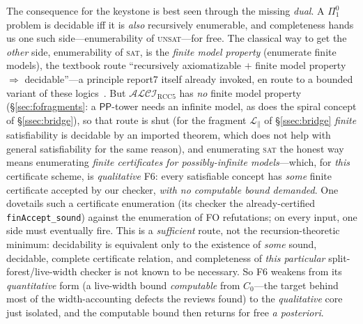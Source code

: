 \documentclass[11pt]{article}
\newcommand{\ALCIRCC}[1]{\mathcal{ALCI}_{\mathrm{RCC#1}}}
\newcommand{\PP}{\mathsf{PP}}
\newcommand{\code}[1]{\texttt{#1}}
\theoremstyle{plain}
\theoremstyle{definition}
\begin{document}
The consequence for the keystone is best seen through the missing
\emph{dual}. A $\Pi^0_1$ problem is decidable iff it is \emph{also}
recursively enumerable, and completeness hands us one such
side---enumerability of \textsc{unsat}---for free. The classical way to get
the \emph{other} side, enumerability of \textsc{sat}, is the \emph{finite
model property} (enumerate finite models), the textbook route ``recursively
axiomatizable $+$ finite model property $\Rightarrow$ decidable''---a
principle report7 itself already invoked, en route to a bounded variant of
these logics~\cite{Wessel2003}. But
$\ALCIRCC{5}$ has \emph{no} finite model property (\S\ref{sec:fofragments}:
a $\PP$-tower needs an infinite model, as does the spiral concept of
\S\ref{ssec:bridge}), so that route is shut (for the fragment
$\mathcal L_{\parallel}$ of \S\ref{ssec:bridge} \emph{finite} satisfiability is
decidable by an imported theorem, which does not help with general
satisfiability for the same reason),
and enumerating \textsc{sat} the honest way means enumerating \emph{finite
certificates for possibly-infinite models}---which, for \emph{this}
certificate scheme, is \emph{qualitative} F6: every satisfiable concept
has \emph{some} finite certificate accepted by our checker, \emph{with no
computable bound demanded}. One dovetails such a certificate enumeration
(its checker the already-certified \code{finAccept\_sound}) against the
enumeration of FO refutations; on every input, one side must eventually
fire. This is a \emph{sufficient} route, not the recursion-theoretic
minimum: decidability is equivalent only to the existence of \emph{some}
sound, decidable, complete certificate relation, and completeness of
\emph{this particular} split-forest/live-width checker is not known to be
necessary. So F6 weakens from its
\emph{quantitative} form (a live-width bound \emph{computable} from
$C_0$---the target behind most of the width-accounting defects the reviews
found) to the \emph{qualitative} core just isolated, and the computable bound
then returns for free \emph{a posteriori}.
\end{document}
